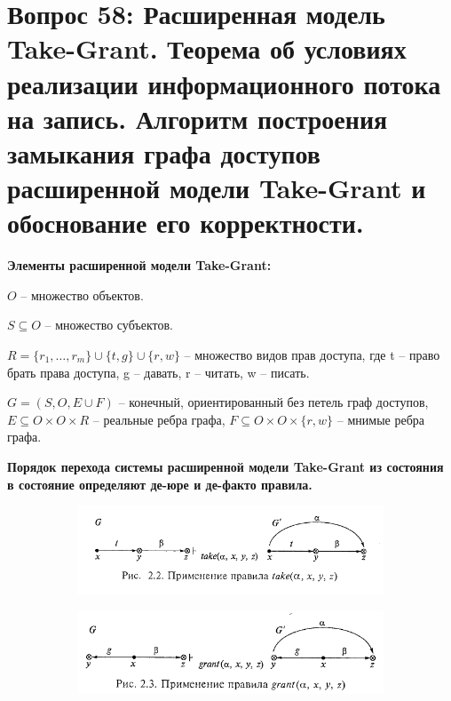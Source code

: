\section{Вопрос 58: Расширенная модель Take-Grant. Теорема об условиях реализации информационного потока на
запись. Алгоритм построения замыкания графа доступов расширенной модели Take-Grant и обоснование
его корректности.}

\textbf{Элементы расширенной модели Take-Grant:}
\begin{enumerate*}
		\item $ O $ -- множество объектов.
		\item $S \subseteq O$ -- множество субъектов.
		\item $ R = \{ r_1, \ldots, r_m \} \cup \{ t, g \} \cup \{r, w\} $ -- множество видов прав доступа, где t -- право брать права доступа, g -- давать, r -- читать, w -- писать.
		\item $ G = (S, O, E \cup F) $ -- конечный, ориентированный без петель граф доступов, $E \subseteq O \times O \times R $ -- реальные ребра графа, $ F \subseteq O \times O \times \{r, w\} $ -- мнимые ребра графа.
\end{enumerate*}

\textbf{Порядок перехода системы расширенной модели Take-Grant из состояния в состояние определяют де-юре и де-факто правила.}

\begin{figure}[H]
	\centering
	\begin{subfigure}[b]{0.4\textwidth}
		\includegraphics[width=\textwidth]{img/8.png}
		\captionsetup{labelformat=empty}
	\end{subfigure}
	\begin{subfigure}[b]{0.4\textwidth}
		\includegraphics[width=\textwidth]{img/9.png}
		\captionsetup{labelformat=empty}
	\end{subfigure}
\end{figure}

